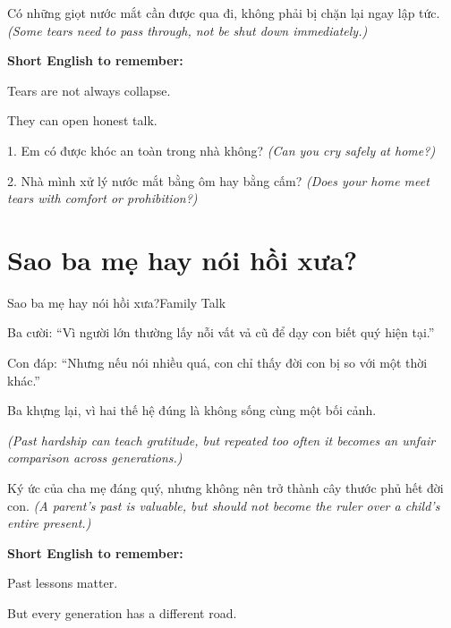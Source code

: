 \begin{baihoc}
Có những giọt nước mắt cần được qua đi, không phải bị chặn lại ngay lập tức.
\textit{(Some tears need to pass through, not be shut down immediately.)}
\end{baihoc}

\begin{ghinhoanh}
\textbf{Short English to remember:}

Tears are not always collapse.

They can open honest talk.
\end{ghinhoanh}

\begin{tuhocnhanh}
1. Em có được khóc an toàn trong nhà không? \textit{(Can you cry safely at home?)}

2. Nhà mình xử lý nước mắt bằng ôm hay bằng cấm? \textit{(Does your home meet tears with comfort or prohibition?)}
\end{tuhocnhanh}
\ngancach

\section{Sao ba mẹ hay nói hồi xưa?}
\begin{truyen}{Sao ba mẹ hay nói hồi xưa?}{Family Talk}

Ba cười: ``Vì người lớn thường lấy nỗi vất vả cũ để dạy con biết quý hiện tại.''

Con đáp: ``Nhưng nếu nói nhiều quá, con chỉ thấy đời con bị so với một thời khác.''

Ba khựng lại, vì hai thế hệ đúng là không sống cùng một bối cảnh.

\textit{(Past hardship can teach gratitude, but repeated too often it becomes an unfair comparison across generations.)}
\end{truyen}

\begin{baihoc}
Ký ức của cha mẹ đáng quý, nhưng không nên trở thành cây thước phủ hết đời con.
\textit{(A parent's past is valuable, but should not become the ruler over a child's entire present.)}
\end{baihoc}

\begin{ghinhoanh}
\textbf{Short English to remember:}

Past lessons matter.

But every generation has a different road.
\end{ghinhoanh}

